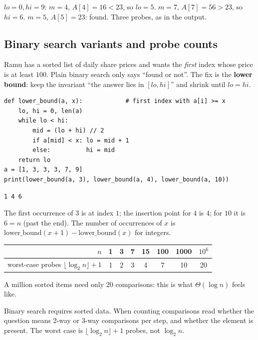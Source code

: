 \documentclass[11pt,a4paper]{article}
\begin{document}
\begin{example}
$lo=0,hi=9$: $m=4$, $A[4]=16<23$, so $lo=5$. $m=7$, $A[7]=56>23$, so $hi=6$. $m=5$, $A[5]=23$: found. Three probes, as in the output.
\end{example}


\subsection{Binary search variants and probe counts}
\begin{story}
Ramu has a sorted list of daily share prices and wants the \emph{first} index whose price is at least $100$. Plain binary search only says ``found or not''. The fix is the \textbf{lower bound}: keep the invariant ``the answer lies in $[lo,hi]$'' and shrink until $lo=hi$.
\end{story}
\begin{lstlisting}
def lower_bound(a, x):            # first index with a[i] >= x
    lo, hi = 0, len(a)
    while lo < hi:
        mid = (lo + hi) // 2
        if a[mid] < x: lo = mid + 1
        else:          hi = mid
    return lo
a = [1, 3, 3, 3, 7, 9]
print(lower_bound(a, 3), lower_bound(a, 4), lower_bound(a, 10))
\end{lstlisting}
\begin{lstlisting}[style=out]
1 4 6
\end{lstlisting}
The first occurrence of $3$ is at index $1$; the insertion point for $4$ is $4$; for $10$ it is $6=n$ (past the end). The number of occurrences of $x$ is $\text{lower\_bound}(x+1)-\text{lower\_bound}(x)$ for integers.
\begin{center}
\begin{tabular}{r|ccccccc}
\toprule
$n$ & 1 & 3 & 7 & 15 & 100 & 1000 & $10^6$\\
\midrule
worst-case probes $\lfloor\log_2 n\rfloor+1$ & 1 & 2 & 3 & 4 & 7 & 10 & 20\\
\bottomrule
\end{tabular}
\end{center}
A million sorted items need only $20$ comparisons: this is what $\Theta(\log n)$ feels like.

\begin{trap}
Binary search requires sorted data. When counting comparisons read whether the question means 2-way or 3-way comparisons per step, and whether the element is present. The worst case is $\lfloor\log_2n\rfloor+1$ probes, not $\log_2 n$.
\end{trap}
\end{document}
